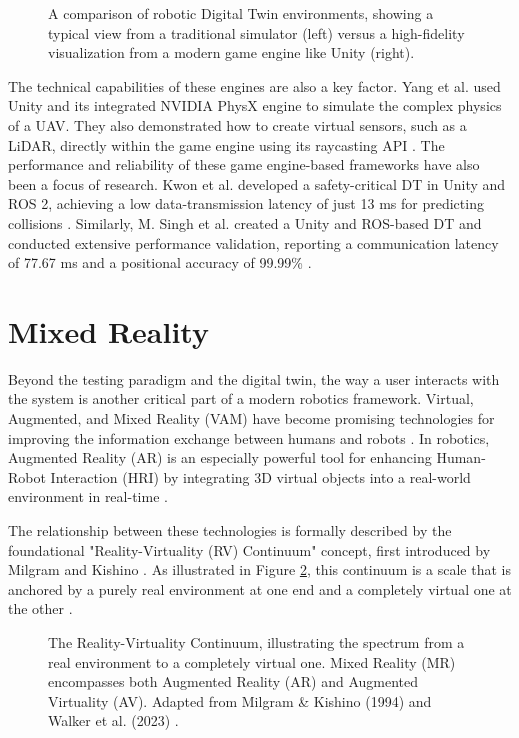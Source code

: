 \begin{figure}[h]
\centering
\caption{A comparison of robotic Digital Twin environments, showing a typical view from a traditional simulator (left) versus a high-fidelity visualization from a modern game engine like Unity (right).}
\label{fig:dt_environments}
\end{figure}

The technical capabilities of these engines are also a key factor. Yang et al. used Unity and its integrated NVIDIA PhysX engine to simulate the complex physics of a UAV. They also demonstrated how to create virtual sensors, such as a LiDAR, directly within the game engine using its raycasting API \cite{Yang2020}. The performance and reliability of these game engine-based frameworks have also been a focus of research. Kwon et al. developed a safety-critical DT in Unity and ROS 2, achieving a low data-transmission latency of just 13 ms for predicting collisions \cite{Kwon2025}. Similarly, M. Singh et al. created a Unity and ROS-based DT and conducted extensive performance validation, reporting a communication latency of 77.67 ms and a positional accuracy of 99.99\% \cite{Singh2024b}.

\section{Mixed Reality}
\label{sec:MR}
Beyond the testing paradigm and the digital twin, the way a user interacts with the system is another critical part of a modern robotics framework. Virtual, Augmented, and Mixed Reality (VAM) have become promising technologies for improving the information exchange between humans and robots \cite{Walker2023}. In robotics, Augmented Reality (AR) is an especially powerful tool for enhancing Human-Robot Interaction (HRI) by integrating 3D virtual objects into a real-world environment in real-time \cite{Makhataeva2020}.

The relationship between these technologies is formally described by the foundational "Reality-Virtuality (RV) Continuum" concept, first introduced by Milgram and Kishino \cite{Milgram1994, Skarbez2021, Makhataeva2020}. As illustrated in Figure \ref{fig:rv_continuum}, this continuum is a scale that is anchored by a purely real environment at one end and a completely virtual one at the other \cite{Milgram1994, Skarbez2021, Makhataeva2020}.

\begin{figure}[h]
\centering
\caption{The Reality-Virtuality Continuum, illustrating the spectrum from a real environment to a completely virtual one. Mixed Reality (MR) encompasses both Augmented Reality (AR) and Augmented Virtuality (AV). Adapted from Milgram \& Kishino (1994) \cite{Milgram1994} and Walker et al. (2023) \cite{Walker2023}.}
\label{fig:rv_continuum}
\end{figure}

